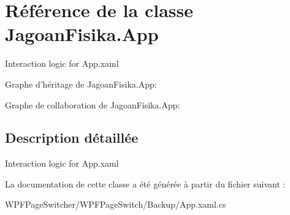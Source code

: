 \hypertarget{class_jagoan_fisika_1_1_app}{\section{Référence de la classe Jagoan\+Fisika.\+App}
\label{class_jagoan_fisika_1_1_app}
}


Interaction logic for App.\+xaml  




Graphe d'héritage de Jagoan\+Fisika.\+App\+:


Graphe de collaboration de Jagoan\+Fisika.\+App\+:


\subsection{Description détaillée}
Interaction logic for App.\+xaml 



La documentation de cette classe a été générée à partir du fichier suivant \+:\begin{DoxyCompactItemize}
\item 
W\+P\+F\+Page\+Switcher/\+W\+P\+F\+Page\+Switch/\+Backup/App.\+xaml.\+cs\end{DoxyCompactItemize}
